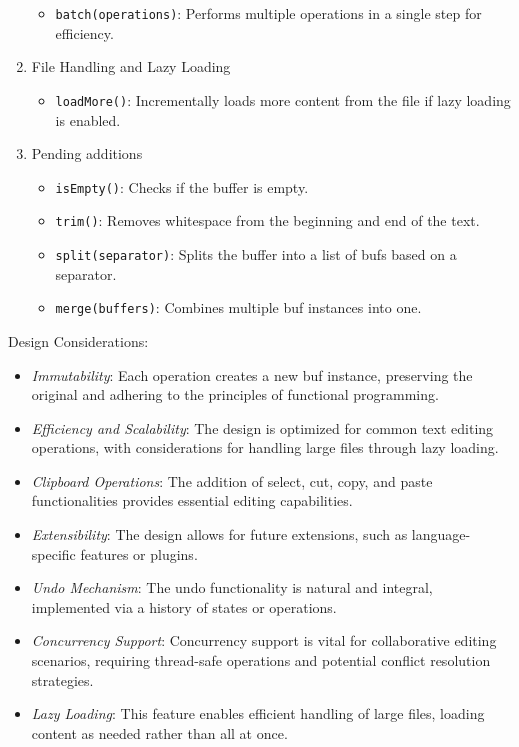\begin{enumerate}
  \begin{itemize}
  \tightlist
  \item
    \texttt{batch(operations)}: Performs multiple operations in a single
    step for efficiency.
  \end{itemize}
\item
  File Handling and Lazy Loading

  \begin{itemize}
  \tightlist
  \item
    \texttt{loadMore()}: Incrementally loads more content from the file
    if lazy loading is enabled.
  \end{itemize}
\item
  Pending additions

  \begin{itemize}
  \tightlist
  \item
    \texttt{isEmpty()}: Checks if the buffer is empty.
  \item
    \texttt{trim()}: Removes whitespace from the beginning and end of
    the text.
  \item
    \texttt{split(separator)}: Splits the buffer into a list of bufs
    based on a separator.
  \item
    \texttt{merge(buffers)}: Combines multiple buf instances into one.
  \end{itemize}
\end{enumerate}

Design Considerations:

\begin{itemize}
\tightlist
\item
  \emph{Immutability}: Each operation creates a new buf instance,
  preserving the original and adhering to the principles of functional
  programming.
\item
  \emph{Efficiency and Scalability}: The design is optimized for common
  text editing operations, with considerations for handling large files
  through lazy loading.
\item
  \emph{Clipboard Operations}: The addition of select, cut, copy, and
  paste functionalities provides essential editing capabilities.
\item
  \emph{Extensibility}: The design allows for future extensions, such as
  language-specific features or plugins.
\item
  \emph{Undo Mechanism}: The undo functionality is natural and integral,
  implemented via a history of states or operations.
\item
  \emph{Concurrency Support}: Concurrency support is vital for
  collaborative editing scenarios, requiring thread-safe operations and
  potential conflict resolution strategies.
\item
  \emph{Lazy Loading}: This feature enables efficient handling of large
  files, loading content as needed rather than all at once.
\end{itemize}

